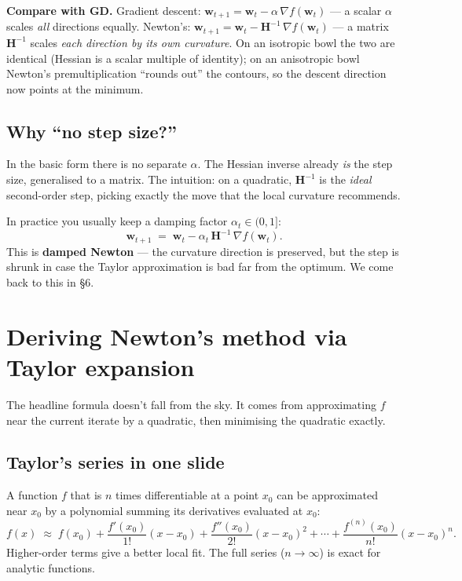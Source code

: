 \documentclass[11pt, a4paper]{article}
\begin{document}
\textbf{Compare with GD.} Gradient descent: $\mathbf{w}_{t+1} = \mathbf{w}_t - \alpha\,\nabla f(\mathbf{w}_t)$ — a scalar $\alpha$ scales \emph{all} directions equally. Newton's: $\mathbf{w}_{t+1} = \mathbf{w}_t - \mathbf{H}^{-1}\,\nabla f(\mathbf{w}_t)$ — a matrix $\mathbf{H}^{-1}$ scales \emph{each direction by its own curvature}. On an isotropic bowl the two are identical (Hessian is a scalar multiple of identity); on an anisotropic bowl Newton's premultiplication ``rounds out'' the contours, so the descent direction now points at the minimum.

\subsection{Why ``no step size?''}

In the basic form there is no separate $\alpha$. The Hessian inverse already \emph{is} the step size, generalised to a matrix. The intuition: on a quadratic, $\mathbf{H}^{-1}$ is the \emph{ideal} second-order step, picking exactly the move that the local curvature recommends.

In practice you usually keep a damping factor $\alpha_t \in (0,1]$:
\[
\mathbf{w}_{t+1} \;=\; \mathbf{w}_t - \alpha_t\,\mathbf{H}^{-1}\,\nabla f(\mathbf{w}_t).
\]
This is \textbf{damped Newton} — the curvature direction is preserved, but the step is shrunk in case the Taylor approximation is bad far from the optimum. We come back to this in §6.

\section{Deriving Newton's method via Taylor expansion}

The headline formula doesn't fall from the sky. It comes from approximating $f$ near the current iterate by a quadratic, then minimising the quadratic exactly.

\subsection{Taylor's series in one slide}

\begin{defbox}
A function $f$ that is $n$ times differentiable at a point $x_0$ can be approximated near $x_0$ by a polynomial summing its derivatives evaluated at $x_0$:
\[
f(x) \;\approx\; f(x_0) + \frac{f'(x_0)}{1!}(x-x_0) + \frac{f''(x_0)}{2!}(x-x_0)^2 + \cdots + \frac{f^{(n)}(x_0)}{n!}(x-x_0)^n.
\]
Higher-order terms give a better local fit. The full series ($n\to\infty$) is exact for analytic functions.
\end{defbox}
\end{document}
